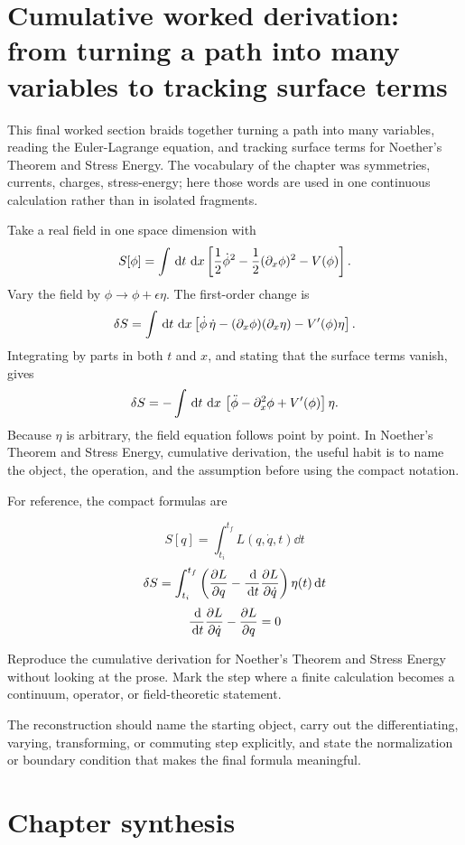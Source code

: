 \section{Cumulative worked derivation: from turning a path into many variables to tracking surface terms}

This final worked section braids together turning a path into many variables, reading the Euler-Lagrange equation, and tracking surface terms for Noether's Theorem and Stress Energy.  The vocabulary of the chapter was symmetries, currents, charges, stress-energy; here those words are used in one continuous calculation rather than in isolated fragments.

Take a real field in one space dimension with
\[
  S[\phi]=\int\,\mathrm d t\,\,\mathrm d x\left[
  \frac12\dot\phi^2-\frac12(\partial_x\phi)^2-V(\phi)
  \right].
\]
Vary the field by \(\phi\to\phi+\epsilon\eta\).  The first-order change is
\[
  \delta S=\int\,\mathrm d t\,\,\mathrm d x\left[
  \dot\phi\,\dot\eta-(\partial_x\phi)(\partial_x\eta)-V'(\phi)\eta
  \right].
\]
Integrating by parts in both \(t\) and \(x\), and stating that the surface terms vanish, gives
\[
  \delta S=-\int\,\mathrm d t\,\,\mathrm d x\,
  \left[\ddot\phi-\partial_x^2\phi+V'(\phi)\right]\eta.
\]
Because \(\eta\) is arbitrary, the field equation follows point by point.  In Noether's Theorem and Stress Energy, cumulative derivation, the useful habit is to name the object, the operation, and the assumption before using the compact notation.

For reference, the compact formulas are

\[
  S[q]=\int_{t_i}^{t_f}L(q,\dot q,t)\dd t
\]
\[
  \delta S=\int_{t_i}^{t_f}\left(\frac{\partial L}{\partial q}-\frac{\,\mathrm d}{\,\mathrm d t}\frac{\partial L}{\partial\dot q}\right)\eta(t)\,\mathrm d t
\]
\[
  \frac{\,\mathrm d}{\,\mathrm d t}\frac{\partial L}{\partial\dot q}-\frac{\partial L}{\partial q}=0
\]

\begin{exercise}
Reproduce the cumulative derivation for Noether's Theorem and Stress Energy without looking at the prose.  Mark the step where a finite calculation becomes a continuum, operator, or field-theoretic statement.
\begin{answer}
The reconstruction should name the starting object, carry out the differentiating, varying, transforming, or commuting step explicitly, and state the normalization or boundary condition that makes the final formula meaningful.
\end{answer}
\end{exercise}



\section{Chapter synthesis}

